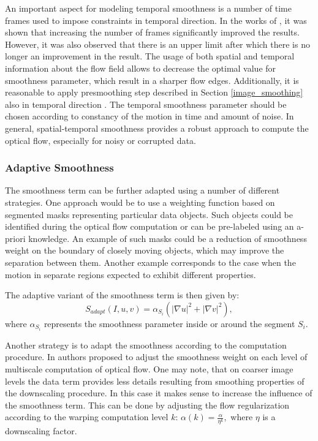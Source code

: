 An important aspect for modeling temporal smoothness is a number of time frames used to impose constraints in temporal direction. In the works of \cite{BruhnThesis}, \cite{HarmonyFlow} it was shown that increasing the number of frames significantly improved the results. However, it was also observed that there is an upper limit after which there is no longer an improvement in the result. The usage of both spatial and temporal information about the flow field allows to decrease the optimal value for smoothness parameter, which result in a sharper flow edges. Additionally, it is reasonable to apply presmoothing step described in Section \ref{image_smoothing} also in temporal direction \cite{BruhnThesis}. The temporal smoothness parameter should be chosen according to constancy of the motion in time and amount of noise.
In general, spatial-temporal smoothness provides a robust approach to compute the optical flow, especially for noisy or corrupted data.



\subsubsection{Adaptive Smoothness}
\label{adaptive_smoothness}


The smoothness term can be further adapted using a number of different strategies.
One approach would be to use a weighting function based on segmented masks representing particular data objects. Such objects could be identified during the optical flow computation or can be pre-labeled using an a-priori knowledge. An example of such masks could be a reduction of smoothness weight on the boundary of closely moving objects, which may improve the separation between them. Another example corresponds to the case when the motion in separate regions expected to exhibit different properties.

The adaptive variant of the smoothness term is then given by:
$$ S_{adapt}(I,u,v) = \alpha_{S_{i}}(|\nabla u|^2 + |\nabla v|^2), $$
where $\alpha_{S_{i}}$ represents the smoothness parameter inside or around the segment $S_{i}$.

Another strategy is to adapt the smoothness according to the computation procedure.
In \cite{HarmonyFlow} authors proposed to adjust the smoothness weight on each level of multiscale computation of optical flow. One may note, that on coarser image levels the data term provides less details resulting from smoothing properties of the downscaling procedure. In this case it makes sense to increase the influence of the smoothness term. This can be done by adjusting the flow regularization according to the warping computation level $k$:
$\alpha(k) = \frac{\alpha}{\eta^k},$
where  $\eta$ is a downscaling factor.



